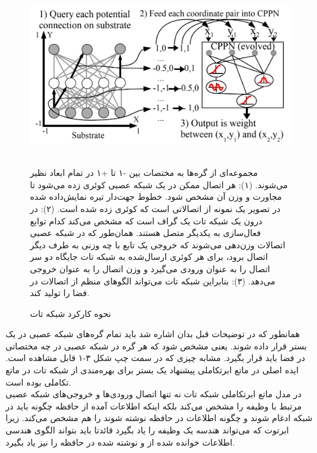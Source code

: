 \begin{figure}[!h]
\begin{center}
\includegraphics[height=7cm]{CPPN.png}
\end{center}
\caption{نحوه کارکرد شبکه تات\cite{merrild2018hyperntm} }
\medskip
\small
مجموعه‌ای از گره‌ها به مختصات بین -۱ تا +۱ در تمام ابعاد نظیر می‌شوند.
(۱): هر اتصال ممکن در یک شبکه عصبی کوئری زده می‌شود تا مجاورت و وزن آن مشخص شود. خطوط جهت‌دار تیره نمایش‌داده شده در تصویر یک نمونه از اتصالاتی است که کوئری زده شده است.
(۲): در درون یک شبکه تات یک گراف است که مشخص می‌کند کدام توابع فعال‌سازی به یکدیگر متصل هستند. همان‌طور که در شبکه عصبی اتصالات وزن‌دهی می‌شوند که خروجی یک تابع با چه وزنی به طرف دیگر اتصال برود، برای هر کوئری ارسال‌شده به شبکه تات جایگاه دو سر اتصال را به عنوان ورودی می‌گیرد و وزن اتصال را به عنوان خروجی می‌دهد. (۳): بنابراین شبکه تات می‌تواند الگوهای منظم از اتصالات در فضا را تولید کند.

\end{figure}

همانطور که در توضیحات قبل بدان اشاره شد باید تمام گره‌های شبکه عصبی در یک بستر قرار داده شوند. یعنی مشخص شود که هر گره در شبکه عصبی در چه مختصاتی در فضا باید قرار بگیرد. مشابه چیزی که در سمت چپ شکل ۳-۱ قابل مشاهده است. ایده اصلی در ماتع ابرتکاملی پیشنهاد یک بستر برای بهره‌مندی از شبکه تات در ماتع تکاملی بوده است.
\\

در مدل ماتع ابرتکاملی شبکه تات نه تنها اتصال ورودی‌ها و خروجی‌های شبکه عصبی مرتبط با وظیفه را مشخص می‌کند بلکه اینکه اطلاعات آمده از حافظه چگونه باید در شبکه ادغام شوند و چگونه اطلاعات در حافظه نوشته شوند را هم مشخص می‌کند. زیرا ابرتوت که می‌تواند هندسه یک وظیفه را یاد بگیرد قائدتا باید بتواند الگوی هندسی اطلاعات خوانده شده از و نوشته شده در حافظه را نیز یاد بگیرد.\cite{merrild2018hyperntm}
\\

